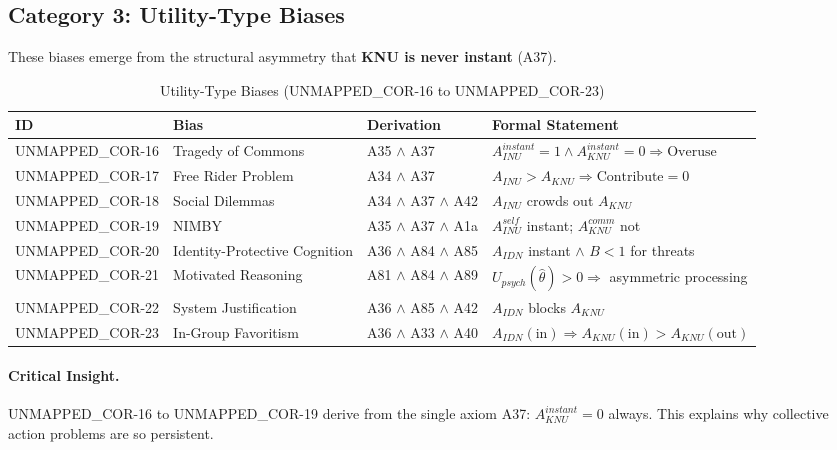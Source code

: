 \subsection{Category 3: Utility-Type Biases}

These biases emerge from the structural asymmetry that \textbf{KNU is never instant} (A37).

\begin{table}[htbp]
\small
\centering
\caption{Utility-Type Biases (UNMAPPED_COR-16 to UNMAPPED_COR-23)}
\label{tab:cor-utility}
\begin{tabular}{p{1.2cm}p{2.8cm}p{3.8cm}p{5cm}}
\toprule
\textbf{ID} & \textbf{Bias} & \textbf{Derivation} & \textbf{Formal Statement} \\
\midrule
UNMAPPED_COR-16 & Tragedy of Commons & A35 $\land$ A37 & $A_{INU}^{instant} = 1 \land A_{KNU}^{instant} = 0 \Rightarrow \text{Overuse}$ \\
UNMAPPED_COR-17 & Free Rider Problem & A34 $\land$ A37 & $A_{INU} > A_{KNU} \Rightarrow \text{Contribute} = 0$ \\
UNMAPPED_COR-18 & Social Dilemmas & A34 $\land$ A37 $\land$ A42 & $A_{INU}$ crowds out $A_{KNU}$ \\
UNMAPPED_COR-19 & NIMBY & A35 $\land$ A37 $\land$ A1a & $A^{self}_{INU}$ instant; $A^{comm}_{KNU}$ not \\
UNMAPPED_COR-20 & Identity-Protective Cognition & A36 $\land$ A84 $\land$ A85 & $A_{IDN}$ instant $\land$ $B < 1$ for threats \\
UNMAPPED_COR-21 & Motivated Reasoning & A81 $\land$ A84 $\land$ A89 & $U_{psych}(\hat{\theta}) > 0 \Rightarrow$ asymmetric processing \\
UNMAPPED_COR-22 & System Justification & A36 $\land$ A85 $\land$ A42 & $A_{IDN}$ blocks $A_{KNU}$ \\
UNMAPPED_COR-23 & In-Group Favoritism & A36 $\land$ A33 $\land$ A40 & $A_{IDN}(\text{in}) \Rightarrow A_{KNU}(\text{in}) > A_{KNU}(\text{out})$ \\
\bottomrule
\end{tabular}
\end{table}

\paragraph{Critical Insight.} UNMAPPED_COR-16 to UNMAPPED_COR-19 derive from the single axiom A37: $A_{KNU}^{instant} = 0$ always. This explains why collective action problems are so persistent.

